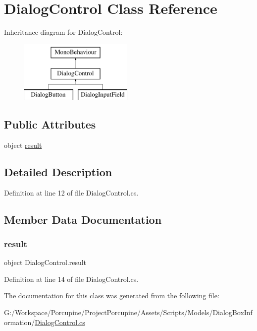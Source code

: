 \hypertarget{class_dialog_control}{}\section{Dialog\+Control Class Reference}
\label{class_dialog_control}
Inheritance diagram for Dialog\+Control\+:\begin{figure}[H]
\begin{center}
\leavevmode
\includegraphics[height=3.000000cm]{class_dialog_control}
\end{center}
\end{figure}
\subsection*{Public Attributes}
\begin{DoxyCompactItemize}
\item 
object \hyperlink{class_dialog_control_a43f2c879895cc4a3f35e4bbb4bad329b}{result}
\end{DoxyCompactItemize}


\subsection{Detailed Description}


Definition at line 12 of file Dialog\+Control.\+cs.



\subsection{Member Data Documentation}
\mbox{\label{class_dialog_control_a43f2c879895cc4a3f35e4bbb4bad329b}} 
\subsubsection{\texorpdfstring{result}{result}}
{\footnotesize\ttfamily object Dialog\+Control.\+result}



Definition at line 14 of file Dialog\+Control.\+cs.



The documentation for this class was generated from the following file\+:\begin{DoxyCompactItemize}
\item 
G\+:/\+Workspace/\+Porcupine/\+Project\+Porcupine/\+Assets/\+Scripts/\+Models/\+Dialog\+Box\+Information/\hyperlink{_dialog_control_8cs}{Dialog\+Control.\+cs}\end{DoxyCompactItemize}
